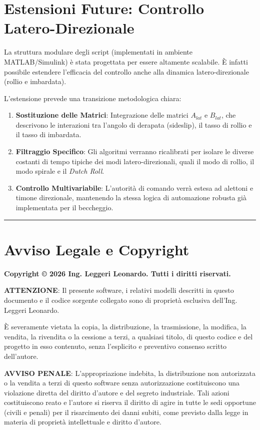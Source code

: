 \documentclass[12pt,a4paper]{article}
\begin{document}
\section{Estensioni Future: Controllo Latero-Direzionale}
La struttura modulare degli script (implementati in ambiente MATLAB/Simulink) è stata progettata per essere altamente scalabile. È infatti possibile estendere l'efficacia del controllo anche alla dinamica latero-direzionale (rollio e imbardata).

L'estensione prevede una transizione metodologica chiara:
\begin{enumerate}
    \item \textbf{Sostituzione delle Matrici}: Integrazione delle matrici $A_{lat}$ e $B_{lat}$, che descrivono le interazioni tra l'angolo di derapata (sideslip), il tasso di rollio e il tasso di imbardata.
    \item \textbf{Filtraggio Specifico}: Gli algoritmi verranno ricalibrati per isolare le diverse costanti di tempo tipiche dei modi latero-direzionali, quali il modo di rollio, il modo spirale e il \textit{Dutch Roll}.
    \item \textbf{Controllo Multivariabile}: L'autorità di comando verrà estesa ad alettoni e timone direzionale, mantenendo la stessa logica di automazione robusta già implementata per il beccheggio.
\end{enumerate}

\vspace{2cm}
\begin{center}
    \rule{0.8\textwidth}{0.4pt}
\end{center}
\vspace{0.5cm}

\section*{Avviso Legale e Copyright}
\textbf{Copyright \copyright{} 2026 Ing. Leggeri Leonardo. Tutti i diritti riservati.}

\vspace{0.3cm}
\noindent
\textbf{ATTENZIONE}: Il presente software, i relativi modelli descritti in questo documento e il codice sorgente collegato sono di proprietà esclusiva dell'Ing. Leggeri Leonardo. 

\vspace{0.3cm}
\noindent
È severamente vietata la copia, la distribuzione, la trasmissione, la modifica, la vendita, la rivendita o la cessione a terzi, a qualsiasi titolo, di questo codice e del progetto in esso contenuto, senza l'esplicito e preventivo consenso scritto dell'autore. 

\vspace{0.3cm}
\noindent
\textbf{AVVISO PENALE}: L'appropriazione indebita, la distribuzione non autorizzata o la vendita a terzi di questo software senza autorizzazione costituiscono una violazione diretta del diritto d'autore e del segreto industriale. Tali azioni costituiscono reato e l'autore si riserva il diritto di agire in tutte le sedi opportune (civili e penali) per il risarcimento dei danni subiti, come previsto dalla legge in materia di proprietà intellettuale e diritto d'autore.
\end{document}
